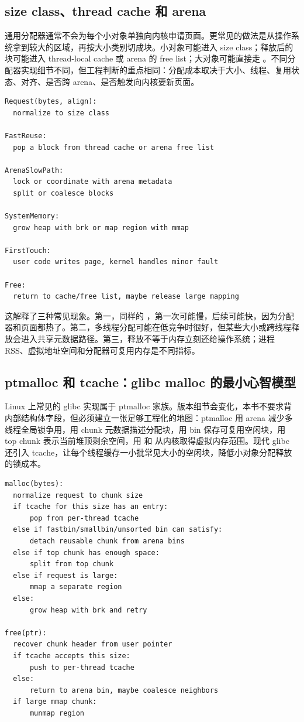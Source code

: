 \subsection{size class、thread cache 和 arena}

通用分配器通常不会为每个小对象单独向内核申请页面。更常见的做法是从操作系统拿到较大的区域，再按大小类别切成块。小对象可能进入 size class；释放后的块可能进入 thread-local cache 或 arena 的 free list；大对象可能直接走 。不同分配器实现细节不同，但工程判断的重点相同：分配成本取决于大小、线程、复用状态、对齐、是否跨 arena、是否触发向内核要新页面。

\begin{lstlisting}[numbers=none,caption={分配器状态机的简化模型}]
Request(bytes, align):
  normalize to size class

FastReuse:
  pop a block from thread cache or arena free list

ArenaSlowPath:
  lock or coordinate with arena metadata
  split or coalesce blocks

SystemMemory:
  grow heap with brk or map region with mmap

FirstTouch:
  user code writes page, kernel handles minor fault

Free:
  return to cache/free list, maybe release large mapping
\end{lstlisting}

这解释了三种常见现象。第一，同样的 ，第一次可能慢，后续可能快，因为分配器和页面都热了。第二，多线程分配可能在低竞争时很好，但某些大小或跨线程释放会进入共享元数据路径。第三，释放不等于内存立刻还给操作系统；进程 RSS、虚拟地址空间和分配器可复用内存是不同指标。

\subsection{ptmalloc 和 tcache：glibc malloc 的最小心智模型}

Linux 上常见的 glibc  实现属于 ptmalloc 家族。版本细节会变化，本书不要求背内部结构体字段，但必须建立一张足够工程化的地图：ptmalloc 用 arena 减少多线程全局锁争用，用 chunk 元数据描述分配块，用 bin 保存可复用空闲块，用 top chunk 表示当前堆顶剩余空间，用  和  从内核取得虚拟内存范围。现代 glibc 还引入 tcache，让每个线程缓存一小批常见大小的空闲块，降低小对象分配释放的锁成本。

\begin{lstlisting}[numbers=none,caption={ptmalloc 的压缩版路径}]
malloc(bytes):
  normalize request to chunk size
  if tcache for this size has an entry:
      pop from per-thread tcache
  else if fastbin/smallbin/unsorted bin can satisfy:
      detach reusable chunk from arena bins
  else if top chunk has enough space:
      split from top chunk
  else if request is large:
      mmap a separate region
  else:
      grow heap with brk and retry

free(ptr):
  recover chunk header from user pointer
  if tcache accepts this size:
      push to per-thread tcache
  else:
      return to arena bin, maybe coalesce neighbors
  if large mmap chunk:
      munmap region
\end{lstlisting}

